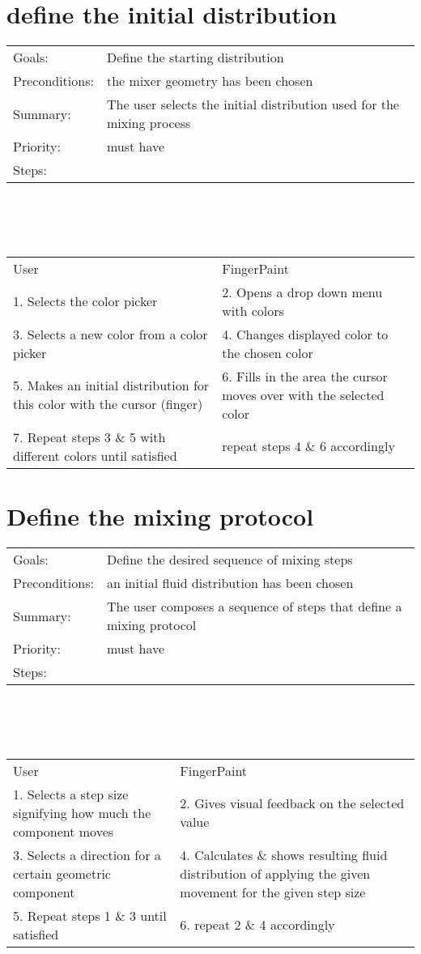 \documentclass[a4paper,twoside,11pt]{article}
\begin{document}
\section*{define the initial distribution}
\begin{tabular}{ll}

 Goals: & Define the starting distribution \\
 Preconditions: & the mixer geometry has been chosen \\
 Summary: & The user selects the initial distribution used for the mixing process \\
 Priority: & must have \\
 Steps: & \\
\end{tabular} \\
\ \\ \ \\
\begin{tabular}{ll}
 User                       & FingerPaint                            \\
 1. Selects the color picker & 2. Opens a drop down menu with colors \\
 3. Selects a new color from a color picker & 4. Changes displayed color to the chosen color \\
 5. Makes an initial distribution for this color with the cursor (finger)  & 6. Fills in the area the cursor moves over with the selected color \\
 7. Repeat steps 3 \& 5 with different colors until satisfied & repeat steps 4 \& 6 accordingly \\
\end{tabular}

\section*{Define the mixing protocol}
\begin{tabular}{ll}

 Goals: & Define the desired sequence of mixing steps \\
 Preconditions: & an initial fluid distribution has been chosen \\
 Summary: & The user composes a sequence of steps that define a mixing protocol \\
 Priority: & must have \\
 Steps: & \\
\end{tabular} \\
\ \\ \ \\
\begin{tabular}{ll}
 User                       & FingerPaint                            \\
 1. Selects a step size signifying how much the component moves & 2. Gives visual feedback on the selected value \\
 3. Selects a direction for a certain geometric component & 4. Calculates \& shows resulting fluid distribution of applying the given movement for the given step size \\
 5. Repeat steps 1 \& 3 until satisfied & 6. repeat 2 \& 4 accordingly \\
\end{tabular}
\end{document}
